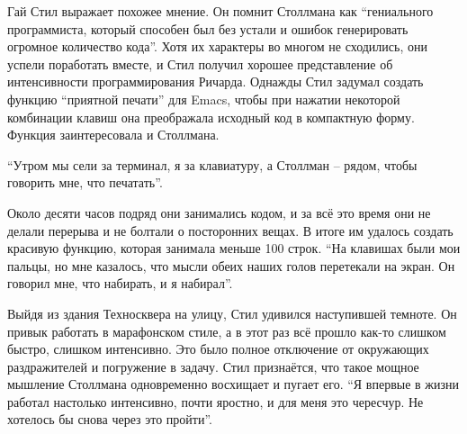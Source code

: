 Гай Стил выражает похожее мнение. Он помнит Столлмана как \enquote{гениального программиста, который способен был без устали и ошибок генерировать огромное количество кода}. Хотя их характеры во многом не сходились, они успели поработать вместе, и Стил получил хорошее представление об интенсивности программирования Ричарда. Однажды Стил задумал создать функцию \enquote{приятной печати} для Emacs, чтобы при нажатии некоторой комбинации клавиш она преображала исходный код в компактную форму. Функция заинтересовала и Столлмана.

\enquote{Утром мы сели за терминал, я за клавиатуру, а Столлман -- рядом, чтобы говорить мне, что печатать}.

Около десяти часов подряд они занимались кодом, и за всё это время они не делали перерыва и не болтали о посторонних вещах. В итоге им удалось создать красивую функцию, которая занимала меньше 100 строк. \enquote{На клавишах были мои пальцы, но мне казалось, что мысли обеих наших голов перетекали на экран. Он говорил мне, что набирать, и я набирал}.

Выйдя из здания Техносквера на улицу, Стил удивился наступившей темноте. Он привык работать в марафонском стиле, а в этот раз всё прошло как-то слишком быстро, слишком интенсивно. Это было полное отключение от окружающих раздражителей и погружение в задачу. Стил признаётся, что такое мощное мышление Столлмана одновременно восхищает и пугает его. \enquote{Я впервые в жизни работал настолько интенсивно, почти яростно, и для меня это чересчур. Не хотелось бы снова через это пройти}.

\theendnotes
\setcounter{endnote}{0}
